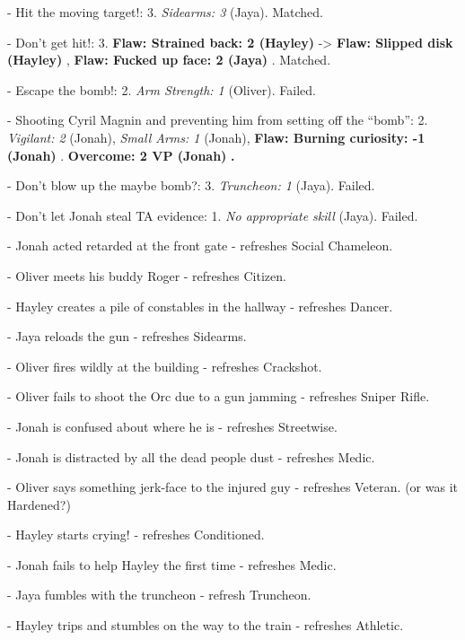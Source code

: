 {- Hit the moving target!: 3.  \textit{Sidearms: 3} (Jaya). Matched. 

- Don't get hit!: 3.  \textbf{ {\color[RGB]{255,0,0}Flaw: Strained back: 2 (Hayley)} } -\textgreater  \textbf{ {\color[RGB]{255,0,0}Flaw: Slipped disk (Hayley)} },  \textbf{ {\color[RGB]{255,0,0}Flaw: Fucked up face: 2 (Jaya)} }. Matched. 

- Escape the bomb!: 2.  \textit{Arm Strength: 1} (Oliver).  Failed.

- Shooting Cyril Magnin and preventing him from setting off the ``bomb'': 2. \textit{Vigilant: 2} (Jonah), \textit{Small Arms: 1} (Jonah), \textbf{ {\color[RGB]{255,0,0} Flaw: Burning curiosity: -1 (Jonah)} }.  \textbf{ {\color[RGB]{0,0,255}Overcome: 2 VP (Jonah)} }\textbf{.}

- Don't blow up the maybe bomb?: 3.  \textit{Truncheon: 1} (Jaya). Failed. 

- Don't let Jonah steal TA evidence: 1.  \textit{No appropriate skill} (Jaya).  Failed.
}



{
\parskip=0pt

- Jonah acted retarded at the front gate - refreshes Social Chameleon.

- Oliver meets his buddy Roger - refreshes Citizen.

- Hayley creates a pile of constables in the hallway - refreshes Dancer.

- Jaya reloads the gun - refreshes Sidearms.

- Oliver fires wildly at the building - refreshes Crackshot.

- Oliver fails to shoot the Orc due to a gun jamming - refreshes Sniper Rifle.

- Jonah is confused about where he is - refreshes Streetwise.

- Jonah is distracted by all the dead people dust - refreshes Medic.

- Oliver says something jerk-face to the injured guy - refreshes Veteran. (or was it Hardened?)

- Hayley starts crying! - refreshes Conditioned.

- Jonah fails to help Hayley the first time - refreshes Medic.

- Jaya fumbles with the truncheon - refresh Truncheon. 

- Hayley trips and stumbles on the way to the train - refreshes Athletic.
}





